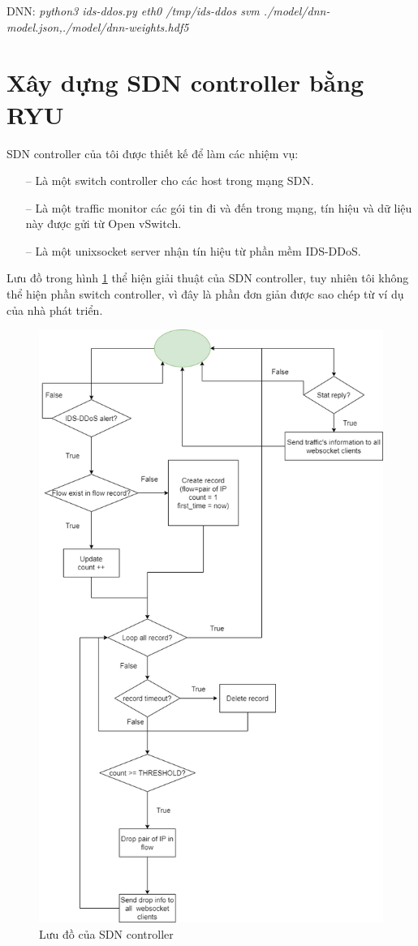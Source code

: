 DNN: \textit{python3 ids-ddos.py eth0 /tmp/ids-ddos svm ./model/dnn-model.json,./model/dnn-weights.hdf5}

\section{Xây dựng SDN controller bằng RYU}
\label{traffic-monitor}

SDN controller của tôi được thiết kế để làm các nhiệm vụ:

\begin{itemize}
	\item[--] Là một switch controller cho các host trong mạng SDN.
	\item[--] Là một traffic monitor các gói tin đi và đến trong mạng, tín hiệu và dữ liệu này được gửi từ Open vSwitch.
	\item[--] Là một unixsocket server nhận tín hiệu từ phần mềm IDS-DDoS.
\end{itemize}

Lưu đồ trong hình \ref{fig:sdn-controller} thể hiện giải thuật của SDN controller, tuy nhiên tôi không thể hiện phần switch controller, vì đây là phần đơn giản được sao chép từ ví dụ của nhà phát triển.

\begin{figure}[ht!]
	\centering
	\includegraphics[width=0.75\linewidth]{fig/sdn-controller.png}
	\caption{Lưu đồ của SDN controller}
	\label{fig:sdn-controller}
\end{figure}

